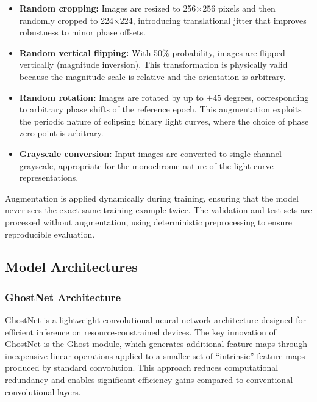 \documentclass[11pt,a4paper]{article}
\begin{document}
\begin{itemize}
    \item \textbf{Random cropping:} Images are resized to 256$\times$256 pixels and then randomly cropped to 224$\times$224, introducing translational jitter that improves robustness to minor phase offsets.
    
    \item \textbf{Random vertical flipping:} With 50\% probability, images are flipped vertically (magnitude inversion). This transformation is physically valid because the magnitude scale is relative and the orientation is arbitrary.
    
    \item \textbf{Random rotation:} Images are rotated by up to $\pm 45$ degrees, corresponding to arbitrary phase shifts of the reference epoch. This augmentation exploits the periodic nature of eclipsing binary light curves, where the choice of phase zero point is arbitrary.
    
    \item \textbf{Grayscale conversion:} Input images are converted to single-channel grayscale, appropriate for the monochrome nature of the light curve representations.
\end{itemize}

Augmentation is applied dynamically during training, ensuring that the model never sees the exact same training example twice. The validation and test sets are processed without augmentation, using deterministic preprocessing to ensure reproducible evaluation.

\subsection{Model Architectures}\label{sec:architectures}

\subsubsection{GhostNet Architecture}

GhostNet \citep{han2020ghostnet} is a lightweight convolutional neural network architecture designed for efficient inference on resource-constrained devices. The key innovation of GhostNet is the Ghost module, which generates additional feature maps through inexpensive linear operations applied to a smaller set of ``intrinsic'' feature maps produced by standard convolution. This approach reduces computational redundancy and enables significant efficiency gains compared to conventional convolutional layers.
\end{document}
